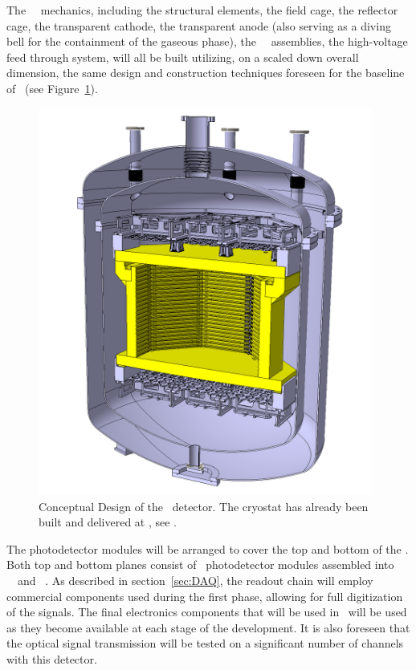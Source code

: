 The \DSps\ \TPC\ mechanics, including the structural elements, the field cage, the reflector cage, the transparent cathode, the transparent anode (also serving as a diving bell for the containment of the gaseous phase), the \SiPM\ \DSkPdm\ assemblies, the high-voltage feed through system, will all be built utilizing, on a scaled down overall dimension, the same design and construction techniques foreseen for the baseline of \DSks\ (see Figure~\ref{fig:proto_1ton}). 

\begin{figure}[!t]
\centering
\includegraphics[width=0.98\textwidth]{./Figures/proto_1ton_newdesign_crop.png}
\caption[Conceptual design of the \DSps\ detector]{Conceptual Design of the \DSps\ detector.  The cryostat has already been built and delivered at \CERN, see .}
\label{fig:proto_1ton}
\end{figure}

The photodetector modules will be arranged to cover the top and bottom of the \TPC. Both top and bottom planes consist of \DSpPdmsHalfNumber\ photodetector modules assembled into \DSpSQBsNumber\ \SQBs\ and \DSpTRBsNumber\ \TRBs. As described in section~\ref{sec:DAQ}, the readout chain will employ commercial components used during the first phase, allowing for full digitization of the signals.  The final electronics components that will be used in \DSks\ will be used as they become available at each stage of the development. It is also foreseen that the optical signal transmission will be tested on a significant number of channels with this detector.

